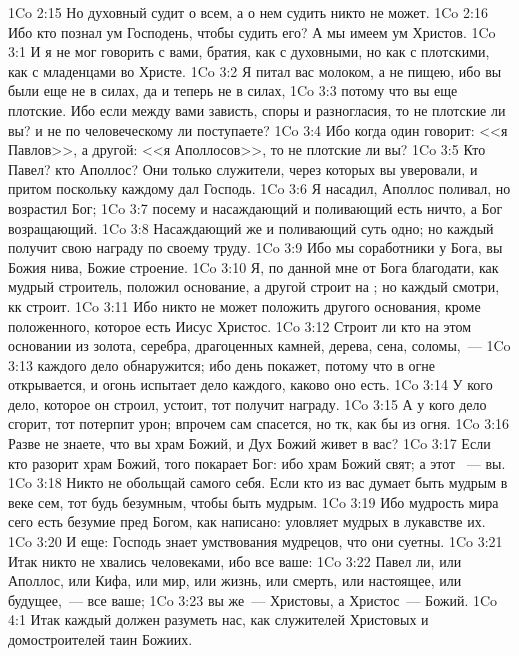 \vs 1Co 2:15 Но духовный судит о всем, а о нем судить никто не может.
\vs 1Co 2:16 Ибо кто познал ум Господень, чтобы  судить его? А мы имеем ум Христов.
\vs 1Co 3:1 И я не мог говорить с вами, братия, как с духовными, но как с плотскими, как с младенцами во Христе.
\vs 1Co 3:2 Я питал вас молоком, а не  пищею, ибо вы были еще не в силах, да и теперь не в силах,
\vs 1Co 3:3 потому что вы еще плотские. Ибо если между вами зависть, споры и разногласия, то не плотские ли вы? и не по человеческому ли  поступаете?
\vs 1Co 3:4 Ибо когда один говорит: <<я Павлов>>, а другой: <<я Аполлосов>>, то не плотские ли вы?
\vs 1Co 3:5 Кто Павел? кто Аполлос? Они только служители, через которых вы уверовали, и притом поскольку каждому дал Господь.
\vs 1Co 3:6 Я насадил, Аполлос поливал, но возрастил Бог;
\vs 1Co 3:7 посему и насаждающий и поливающий есть ничто, а  Бог возращающий.
\vs 1Co 3:8 Насаждающий же и поливающий суть одно; но каждый получит свою награду по своему труду.
\vs 1Co 3:9 Ибо мы соработники у Бога,  вы Божия нива, Божие строение.
\rsbpar\vs 1Co 3:10 Я, по данной мне от Бога благодати, как мудрый строитель, положил основание, а другой строит на ; но каждый смотри, кк строит.
\vs 1Co 3:11 Ибо никто не может положить другого основания, кроме положенного, которое есть Иисус Христос.
\vs 1Co 3:12 Строит ли кто на этом основании из золота, серебра, драгоценных камней, дерева, сена, соломы,~---
\vs 1Co 3:13 каждого дело обнаружится; ибо день покажет, потому что в огне открывается, и огонь испытает дело каждого, каково оно есть.
\vs 1Co 3:14 У кого дело, которое он строил, устоит, тот получит награду.
\vs 1Co 3:15 А у кого дело сгорит, тот потерпит урон; впрочем сам спасется, но тк, как бы из огня.
\rsbpar\vs 1Co 3:16 Разве не знаете, что вы храм Божий, и Дух Божий живет в вас?
\vs 1Co 3:17 Если кто разорит храм Божий, того покарает Бог: ибо храм Божий свят; а этот ~--- вы.
\rsbpar\vs 1Co 3:18 Никто не обольщай самого себя. Если кто из вас думает быть мудрым в веке сем, тот будь безумным, чтобы быть мудрым.
\vs 1Co 3:19 Ибо мудрость мира сего есть безумие пред Богом, как написано: уловляет мудрых в лукавстве их.
\vs 1Co 3:20 И еще: Господь знает умствования мудрецов, что они суетны.
\vs 1Co 3:21 Итак никто не хвались человеками, ибо все ваше:
\vs 1Co 3:22 Павел ли, или Аполлос, или Кифа, или мир, или жизнь, или смерть, или настоящее, или будущее,~--- все ваше;
\vs 1Co 3:23 вы же~--- Христовы, а Христос~--- Божий.
\vs 1Co 4:1 Итак каждый должен разуметь нас, как служителей Христовых и домостроителей таин Божиих.

